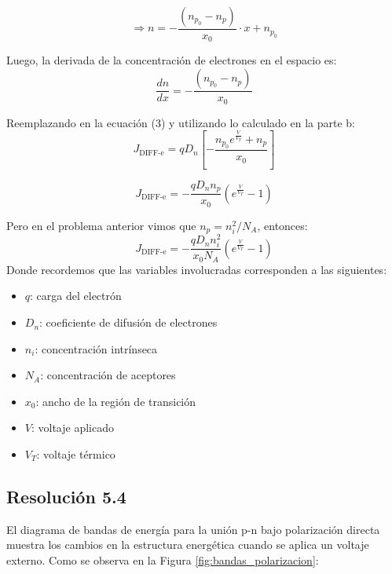 \documentclass[
  11pt,
  letterpaper,
   addpoints,
   answers
  ]{exam}
\begin{document}
\begin{questions}
\begin{solution}
    \begin{equation}
        \Rightarrow n = -\frac{(n_{p_0} - n_p)}{x_0} \cdot x + n_{p_0}
    \end{equation}

    Luego, la derivada de la concentración de electrones en el espacio es:
    \begin{equation}
        \frac{dn}{dx} = -\frac{(n_{p_0} - n_p)}{x_0}
    \end{equation}

    Reemplazando en la ecuación (3) y utilizando lo calculado en la parte b:
    \begin{equation}
        J_{\text{DIFF-e}} = qD_n\left[-\frac{n_{p_0}e^{\frac{V}{V_T}} + n_p}{x_0}\right]
    \end{equation}

    \begin{equation}
        J_{\text{DIFF-e}} = -\frac{qD_nn_p}{x_0}\left(e^{\frac{V}{V_T}} - 1\right)
    \end{equation}

    Pero en el problema anterior vimos que $n_p = n_i^2/N_A$, entonces:
    \begin{equation}
        J_{\text{DIFF-e}} = -\frac{qD_nn_i^2}{x_0N_A}\left(e^{\frac{V}{V_T}} - 1\right)
    \end{equation}
    Donde recordemos que las variables involucradas corresponden a las siguientes:
    \begin{itemize}
        \item $q$: carga del electrón
        \item $D_n$: coeficiente de difusión de electrones
        \item $n_i$: concentración intrínseca
        \item $N_A$: concentración de aceptores
        \item $x_0$: ancho de la región de transición
        \item $V$: voltaje aplicado
        \item $V_T$: voltaje térmico
    \end{itemize}

    \subsection*{Resolución 5.4}
    
    El diagrama de bandas de energía para la unión p-n bajo polarización directa muestra los cambios en la estructura energética cuando se aplica un voltaje externo. Como se observa en la Figura \ref{fig:bandas_polarizacion}:


\end{solution}
\end{questions}
\end{document}
